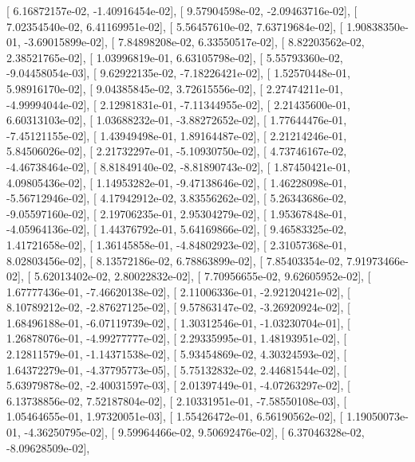 \documentclass{article}
\begin{document}
       [  6.16872157e-02,  -1.40916454e-02],
       [  9.57904598e-02,  -2.09463716e-02],
       [  7.02354540e-02,   6.41169951e-02],
       [  5.56457610e-02,   7.63719684e-02],
       [  1.90838350e-01,  -3.69015899e-02],
       [  7.84898208e-02,   6.33550517e-02],
       [  8.82203562e-02,   2.38521765e-02],
       [  1.03996819e-01,   6.63105798e-02],
       [  5.55793360e-02,  -9.04458054e-03],
       [  9.62922135e-02,  -7.18226421e-02],
       [  1.52570448e-01,   5.98916170e-02],
       [  9.04385845e-02,   3.72615556e-02],
       [  2.27474211e-01,  -4.99994044e-02],
       [  2.12981831e-01,  -7.11344955e-02],
       [  2.21435600e-01,   6.60313103e-02],
       [  1.03688232e-01,  -3.88272652e-02],
       [  1.77644476e-01,  -7.45121155e-02],
       [  1.43949498e-01,   1.89164487e-02],
       [  2.21214246e-01,   5.84506026e-02],
       [  2.21732297e-01,  -5.10930750e-02],
       [  4.73746167e-02,  -4.46738464e-02],
       [  8.81849140e-02,  -8.81890743e-02],
       [  1.87450421e-01,   4.09805436e-02],
       [  1.14953282e-01,  -9.47138646e-02],
       [  1.46228098e-01,  -5.56712946e-02],
       [  4.17942912e-02,   3.83556262e-02],
       [  5.26343686e-02,  -9.05597160e-02],
       [  2.19706235e-01,   2.95304279e-02],
       [  1.95367848e-01,  -4.05964136e-02],
       [  1.44376792e-01,   5.64169866e-02],
       [  9.46583325e-02,   1.41721658e-02],
       [  1.36145858e-01,  -4.84802923e-02],
       [  2.31057368e-01,   8.02803456e-02],
       [  8.13572186e-02,   6.78863899e-02],
       [  7.85403354e-02,   7.91973466e-02],
       [  5.62013402e-02,   2.80022832e-02],
       [  7.70956655e-02,   9.62605952e-02],
       [  1.67777436e-01,  -7.46620138e-02],
       [  2.11006336e-01,  -2.92120421e-02],
       [  8.10789212e-02,  -2.87627125e-02],
       [  9.57863147e-02,  -3.26920924e-02],
       [  1.68496188e-01,  -6.07119739e-02],
       [  1.30312546e-01,  -1.03230704e-01],
       [  1.26878076e-01,  -4.99277777e-02],
       [  2.29335995e-01,   1.48193951e-02],
       [  2.12811579e-01,  -1.14371538e-02],
       [  5.93454869e-02,   4.30324593e-02],
       [  1.64372279e-01,  -4.37795773e-05],
       [  5.75132832e-02,   2.44681544e-02],
       [  5.63979878e-02,  -2.40031597e-03],
       [  2.01397449e-01,  -4.07263297e-02],
       [  6.13738856e-02,   7.52187804e-02],
       [  2.10331951e-01,  -7.58550108e-03],
       [  1.05464655e-01,   1.97320051e-03],
       [  1.55426472e-01,   6.56190562e-02],
       [  1.19050073e-01,  -4.36250795e-02],
       [  9.59964466e-02,   9.50692476e-02],
       [  6.37046328e-02,  -8.09628509e-02],
\end{document}
